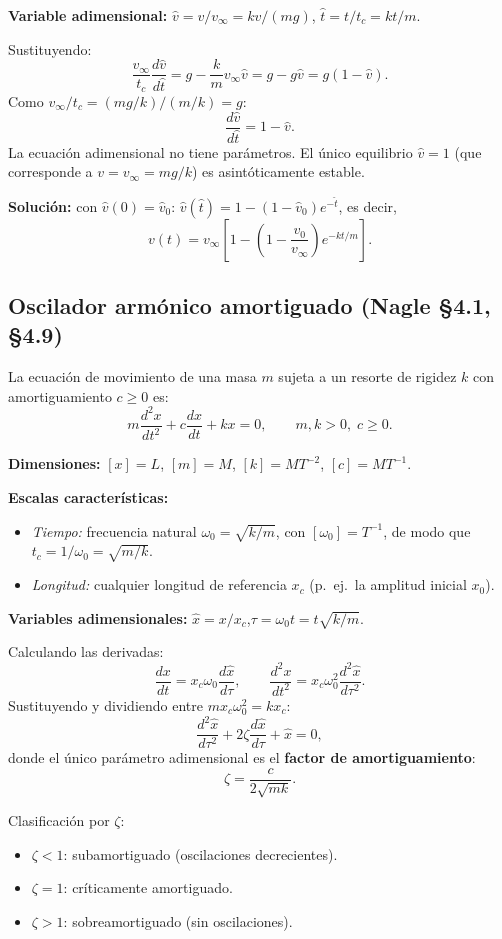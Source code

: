 \documentclass[11pt,letterpaper]{article}
\begin{document}
\textbf{Variable adimensional:} $\hat{v}=v/v_\infty=kv/(mg)$,\quad
$\hat{t}=t/t_c=kt/m$.

Sustituyendo:
\[
\frac{v_\infty}{t_c}\frac{d\hat{v}}{d\hat{t}}=g-\frac{k}{m}v_\infty\hat{v}
=g-g\hat{v}=g(1-\hat{v}).
\]
Como $v_\infty/t_c=(mg/k)/(m/k)=g$:
\[
\boxed{\frac{d\hat{v}}{d\hat{t}}=1-\hat{v}.}
\]
La ecuación adimensional no tiene parámetros. El único equilibrio $\hat{v}=1$
(que corresponde a $v=v_\infty=mg/k$) es asintóticamente estable.

\textbf{Solución:} con $\hat{v}(0)=\hat{v}_0$:
$\hat{v}(\hat{t})=1-(1-\hat{v}_0)e^{-\hat{t}}$, es decir,
\[
v(t)=v_\infty\!\left[1-\!\left(1-\frac{v_0}{v_\infty}\right)e^{-kt/m}\right].
\]

\subsection{Oscilador armónico amortiguado (Nagle §4.1, §4.9)}

La ecuación de movimiento de una masa $m$ sujeta a un resorte de rigidez $k$
con amortiguamiento $c\geq 0$ es:
\[
m\frac{d^2x}{dt^2}+c\frac{dx}{dt}+kx=0,\qquad m,k>0,\;c\geq 0.
\]

\textbf{Dimensiones:} $[x]=L$, $[m]=M$, $[k]=MT^{-2}$, $[c]=MT^{-1}$.

\textbf{Escalas características:}
\begin{itemize}
    \item \emph{Tiempo:} frecuencia natural $\omega_0=\sqrt{k/m}$, con $[\omega_0]=T^{-1}$,
          de modo que $t_c=1/\omega_0=\sqrt{m/k}$.
    \item \emph{Longitud:} cualquier longitud de referencia $x_c$ (p.~ej.\ la amplitud inicial $x_0$).
\end{itemize}

\textbf{Variables adimensionales:} $\hat{x}=x/x_c$,\quad $\tau=\omega_0 t=t\sqrt{k/m}$.

Calculando las derivadas:
\[
\frac{dx}{dt}=x_c\omega_0\frac{d\hat{x}}{d\tau},\qquad
\frac{d^2x}{dt^2}=x_c\omega_0^2\frac{d^2\hat{x}}{d\tau^2}.
\]
Sustituyendo y dividiendo entre $mx_c\omega_0^2=kx_c$:
\[
\boxed{\frac{d^2\hat{x}}{d\tau^2}+2\zeta\frac{d\hat{x}}{d\tau}+\hat{x}=0,}
\]
donde el único parámetro adimensional es el \textbf{factor de amortiguamiento}:
\[
\zeta=\frac{c}{2\sqrt{mk}}.
\]

Clasificación por $\zeta$:
\begin{itemize}
    \item $\zeta<1$: subamortiguado (oscilaciones decrecientes).
    \item $\zeta=1$: críticamente amortiguado.
    \item $\zeta>1$: sobreamortiguado (sin oscilaciones).
\end{itemize}
\end{document}
